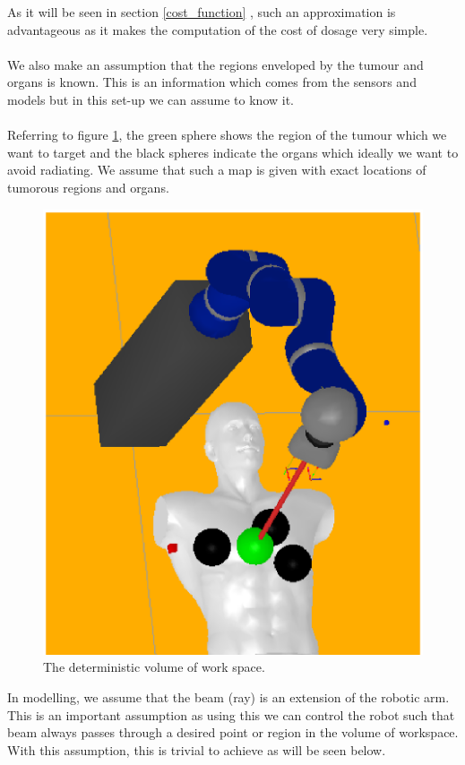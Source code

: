 \documentclass[10pt]{report}
\begin{document}
As it will be seen in section \ref{cost_function} , such an approximation is advantageous as it makes the computation of the cost of dosage very simple.
\\
\\
We also make an assumption that the regions enveloped by the tumour and organs is known. This is an information which comes from the sensors and models but in this set-up we can assume to know it.
\\
\\
Referring to figure \ref{fig_patient}, the green sphere shows the region of the tumour which we want to target and the black spheres indicate the organs which ideally we want to avoid radiating. We assume that such a map is given with exact locations of tumorous regions and organs.
\begin{figure}
\includegraphics[scale=0.5]{resources/images/patient.eps} 
\caption{The deterministic volume of work space.}
\label{fig_patient}
\end{figure}
In modelling, we assume that the beam (ray) is an extension of the robotic arm. This is an important assumption as using this we can control the robot such that beam always passes through a desired point or region in the volume of workspace. With this assumption, this is trivial to achieve as will be seen below.
\end{document}
